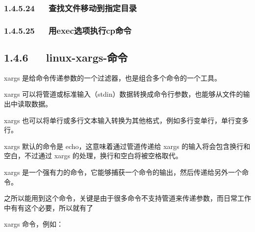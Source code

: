 \documentclass[letterpaper,12pt,english]{sphinxmanual}
\begin{document}
\subsubsection{1.4.5.24   查找文件移动到指定目录}
\label{\detokenize{001software/001install/linux:id20}}
\begin{sphinxVerbatim}[commandchars=\\\{\}]
        \PYGZbs{}
\end{sphinxVerbatim}


\subsubsection{1.4.5.25   用exec选项执行cp命令}
\label{\detokenize{001software/001install/linux:execcp}}
\begin{sphinxVerbatim}[commandchars=\\\{\}]
        \PYGZbs{}
\end{sphinxVerbatim}


\subsection{1.4.6   linux-xargs-命令}
\label{\detokenize{001software/001install/linux:linux-xargs}}
xargs
是给命令传递参数的一个过滤器，也是组合多个命令的一个工具。

xargs
可以将管道或标准输入（stdin）数据转换成命令行参数，也能够从文件的输出中读取数据。

xargs
也可以将单行或多行文本输入转换为其他格式，例如多行变单行，单行变多行。

xargs 默认的命令是 echo，这意味着通过管道传递给 xargs
的输入将会包含换行和空白，不过通过 xargs
的处理，换行和空白将被空格取代。

xargs
是一个强有力的命令，它能够捕获一个命令的输出，然后传递给另外一个命令。

之所以能用到这个命令，关键是由于很多命令不支持\textbar{}管道来传递参数，而日常工作中有有这个必要，所以就有了

xargs 命令，例如：

\begin{sphinxVerbatim}[commandchars=\\\{\}]
            
         
\end{sphinxVerbatim}
\end{document}
